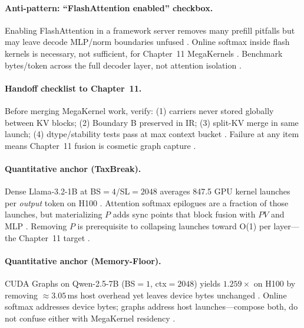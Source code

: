 \paragraph{Anti-pattern: ``FlashAttention enabled'' checkbox.} Enabling FlashAttention in a framework server removes many prefill pitfalls but may leave decode MLP/norm boundaries unfused \citep{dao2022flashattention,dao2023flashdecoding}. Online softmax inside flash kernels is necessary, not sufficient, for Chapter~11 MegaKernels \citep{taxbreak2026,yirage2026}. Benchmark bytes/token across the full decoder layer, not attention isolation \citep{memoryfloor2026,patel2025llminference}.

\paragraph{Handoff checklist to Chapter~11.} Before merging MegaKernel work, verify: (1) carriers never stored globally between KV blocks; (2) Boundary B preserved in IR; (3) split-KV merge in same launch; (4) dtype/stability tests pass at max context bucket \citep{yirage2026,amd2024aie,semianalysis2024tma}. Failure at any item means Chapter~11 fusion is cosmetic graph capture \citep{memoryfloor2026,nvidia2024cudagraphs}.




\paragraph{Quantitative anchor (TaxBreak).} Dense Llama-3.2-1B at BS${=}4$/SL${=}2048$ averages 847.5 GPU kernel launches per \emph{output} token on H100 \citep{taxbreak2026}. Attention softmax epilogues are a fraction of those launches, but materializing $P$ adds sync points that block fusion with $PV$ and MLP \citep{memoryfloor2026,dao2022flashattention}. Removing $P$ is prerequisite to collapsing launches toward O(1) per layer---the Chapter~11 target \citep{taxbreak2026,yirage2026,nvidia2024cudagraphs}.

\paragraph{Quantitative anchor (Memory-Floor).} CUDA Graphs on Qwen-2.5-7B (BS${=}1$, ctx${=}2048$) yields $1.259\times$ on H100 by removing ${\approx}3.05$\,ms host overhead yet leaves device bytes unchanged \citep{memoryfloor2026,nvidia2024cudagraphs}. Online softmax addresses device bytes; graphs address host launches---compose both, do not confuse either with MegaKernel residency \citep{taxbreak2026,patel2025llminference}.

